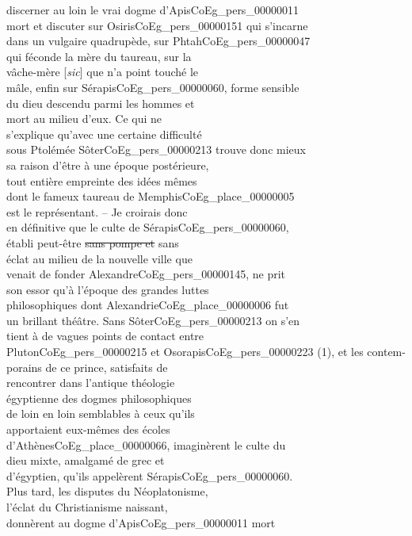 \documentclass{book}
\begin{document}
{\begin{paracol}{2}
discerner au loin le vrai dogme d’Apis\gls{CoEg_pers_00000011}\\
mort et discuter sur Osiris\gls{CoEg_pers_00000151} qui s’incarne\\
dans un vulgaire quadrupède, sur Phtah\gls{CoEg_pers_00000047}\\
qui féconde la mère du taureau, sur la\\
vâche-mère [\textit{sic}] que n’a point touché le\\
mâle, enfin sur Sérapis\gls{CoEg_pers_00000060}, forme sensible\\
du dieu descendu parmi les hommes et\\
mort au milieu d’eux. Ce qui ne\\
s’explique qu’avec une certaine difficulté\\
sous Ptolémée Sôter\gls{CoEg_pers_00000213} trouve donc mieux\\
sa raison d’être à une époque postérieure,\\
tout entière empreinte des idées mêmes\\
dont le fameux taureau de Memphis\gls{CoEg_place_00000005}\\
est le représentant. – Je croirais donc\\
en définitive que le culte de Sérapis\gls{CoEg_pers_00000060},\\
établi peut-être \sout{sans pompe et} sans\\
éclat au milieu de la nouvelle ville que\\
venait de fonder Alexandre\gls{CoEg_pers_00000145}, ne prit\\
son essor qu’à l’époque des grandes luttes\\
philosophiques dont Alexandrie\gls{CoEg_place_00000006} fut\\
un brillant théâtre. Sans Sôter\gls{CoEg_pers_00000213} on s’en\\
tient à de vagues points de contact entre\\
Pluton\gls{CoEg_pers_00000215} et Osorapis\gls{CoEg_pers_00000223} (1), et les contem-\\
porains de ce prince, satisfaits de\\
rencontrer dans l’antique théologie\\
égyptienne des dogmes philosophiques\\
de loin en loin semblables à ceux qu’ils\\
apportaient eux-mêmes des écoles\\
d’Athènes\gls{CoEg_place_00000066}, imaginèrent le culte du\\
dieu mixte, amalgamé de grec et\\
d’égyptien, qu’ils appelèrent Sérapis\gls{CoEg_pers_00000060}.\\
Plus tard, les disputes du Néoplatonisme,\\
l’éclat du Christianisme naissant,\\
donnèrent au dogme d’Apis\gls{CoEg_pers_00000011} mort
\end{paracol}

}
\end{document}

